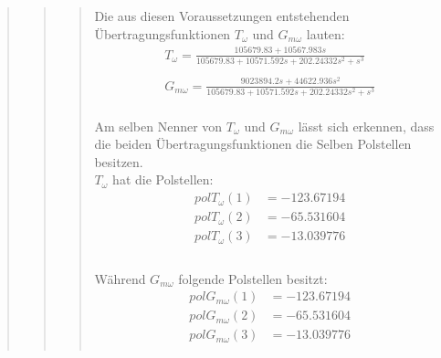 \begin{quote}
\begin{quote}
\begin{quote}
    
            Die aus diesen Voraussetzungen entstehenden Übertragungsfunktionen $T_\omega$ und $G_{m\omega}$ lauten:\\
            
            \begin{equation*}
            	\begin{split}
            		T_\omega = \frac{105679.83 + 10567.983s}{105679.83 + 10571.592s + 202.24332s^2 + s^3}\\ \\
            		G_{m\omega} = \frac{9023894.2s + 44622.936s^2}{105679.83 + 10571.592s + 202.24332s^2 + s^3}
            	\end{split}
            \end{equation*}\\
            
            Am selben Nenner von $T_\omega$ und $G_{m\omega}$ lässt sich erkennen, dass die beiden Übertragungsfunktionen die
            Selben Polstellen besitzen.\\
            
            $T_\omega$ hat die Polstellen:\\
            
            \begin{equation*}
                \begin{split}
                    pol T_\omega (1) &= - 123.67194\\
                    pol T_\omega (2) &= - 65.531604\\
                    pol T_\omega (3) &= - 13.039776\\                   
                \end{split}
            \end{equation*}\\
            
            Während $G_{m\omega}$ folgende Polstellen besitzt:\\
            
            \begin{equation*}
                \begin{split}
                    pol G_{m\omega} (1) &= - 123.67194\\
                    pol G_{m\omega} (2) &= - 65.531604\\                
                    pol G_{m\omega} (3) &= - 13.039776\\              
                \end{split}
            \end{equation*}
            

\end{quote}
\end{quote}
\end{quote}
